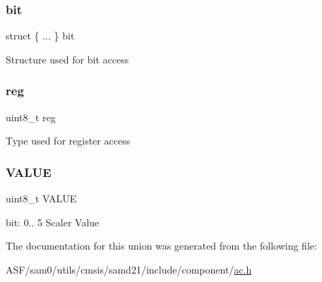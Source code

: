 \subsubsection{\texorpdfstring{bit}{bit}}
{\footnotesize\ttfamily struct \{ ... \}   bit}

Structure used for bit access \mbox{\label{union_a_c___s_c_a_l_e_r___type_a9428adc9af4653a2050e2536b55dec8d}} 
\subsubsection{\texorpdfstring{reg}{reg}}
{\footnotesize\ttfamily uint8\+\_\+t reg}

Type used for register access \mbox{\label{union_a_c___s_c_a_l_e_r___type_a9b29f156e0b21de552a157a1248ee48e}} 
\subsubsection{\texorpdfstring{VALUE}{VALUE}}
{\footnotesize\ttfamily uint8\+\_\+t V\+A\+L\+UE}

bit\+: 0.. 5 Scaler Value 

The documentation for this union was generated from the following file\+:\begin{DoxyCompactItemize}
\item 
A\+S\+F/sam0/utils/cmsis/samd21/include/component/\mbox{\hyperlink{component_2ac_8h}{ac.\+h}}\end{DoxyCompactItemize}
